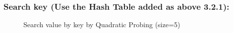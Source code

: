 \subsubsection{Search key (Use the Hash Table added as above 3.2.1):}
\begin{figure}[H]
	\centering
	\qquad
	\caption{Search value by key by Quadratic Probing (size=5)}%
\end{figure}

